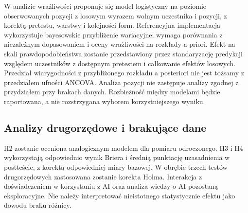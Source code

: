 \documentclass[11pt,a4paper]{article}
\begin{document}
W analizie wrażliwości proponuje się model logistyczny na poziomie obserwowanych pozycji z losowym wyrazem wolnym uczestnika i pozycji, z korektą pretestu, warstwy i kolejności form. Referencyjna implementacja wykorzystuje bayesowskie przybliżenie wariacyjne; wymaga porównania z niezależnym dopasowaniem i oceny wrażliwości na rozkłady a priori. Efekt na skali prawdopodobieństwa zostanie przedstawiony przez standaryzację predykcji względem uczestników z dostępnym pretestem i całkowanie efektów losowych. Przedział wiarygodności z przybliżonego rozkładu a posteriori nie jest tożsamy z przedziałem ufności ANCOVA. Analiza pozycji nie zastępuje analizy zgodnej z przydziałem przy brakach danych. Rozbieżność między modelami będzie raportowana, a nie rozstrzygana wyborem korzystniejszego wyniku.

\subsection{Analizy drugorzędowe i brakujące dane}
H2 zostanie oceniona analogicznym modelem dla pomiaru odroczonego. H3 i H4 wykorzystają odpowiednio wynik Briera i średnią punktację uzasadnienia w postteście, z korektą odpowiedniej miary bazowej. W obrębie trzech testów drugorzędowych zastosowana zostanie korekta Holma. Interakcja z doświadczeniem w korzystaniu z AI oraz analiza wiedzy o AI pozostaną eksploracyjne. Nie należy interpretować nieistotnego statystycznie efektu jako dowodu braku różnicy.
\end{document}
